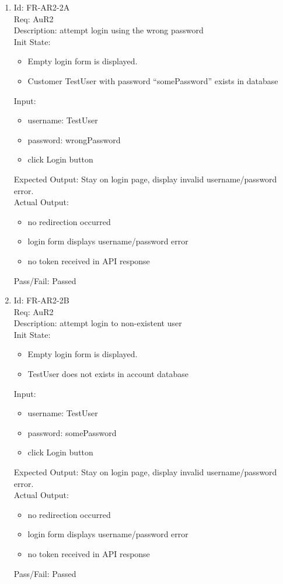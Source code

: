 \documentclass[12pt, titlepage]{article}
\begin{document}
\begin{enumerate}
    \item Id: FR-AR2-2A\\
    Req: AuR2\\
    Description: attempt login using the wrong password\\
    Init State: \begin{itemize}[noitemsep,topsep=0pt]
        \item Empty login form is displayed.
        \item Customer TestUser with password ``somePassword'' exists in database
    \end{itemize}
    Input: \begin{itemize}[noitemsep,topsep=0pt]
        \item username: TestUser
        \item password: wrongPassword
        \item click Login button
    \end{itemize}
    Expected Output: Stay on login page, display invalid username/password error.\\ 
    Actual Output: \begin{itemize}[noitemsep,topsep=0pt]
        \item no redirection occurred
        \item login form displays username/password error
        \item no token received in API response
    \end{itemize}
    Pass/Fail: Passed

    \item Id: FR-AR2-2B\\
    Req: AuR2\\
    Description: attempt login to non-existent user\\
    Init State: \begin{itemize}[noitemsep,topsep=0pt]
        \item Empty login form is displayed.
        \item TestUser does not exists in account database
    \end{itemize}
    Input: \begin{itemize}[noitemsep,topsep=0pt]
        \item username: TestUser
        \item password: somePassword
        \item click Login button
    \end{itemize}
    Expected Output: Stay on login page, display invalid username/password error.\\ 
    Actual Output: \begin{itemize}[noitemsep,topsep=0pt]
        \item no redirection occurred
        \item login form displays username/password error
        \item no token received in API response
    \end{itemize}
    Pass/Fail: Passed


\end{enumerate}
\end{document}

